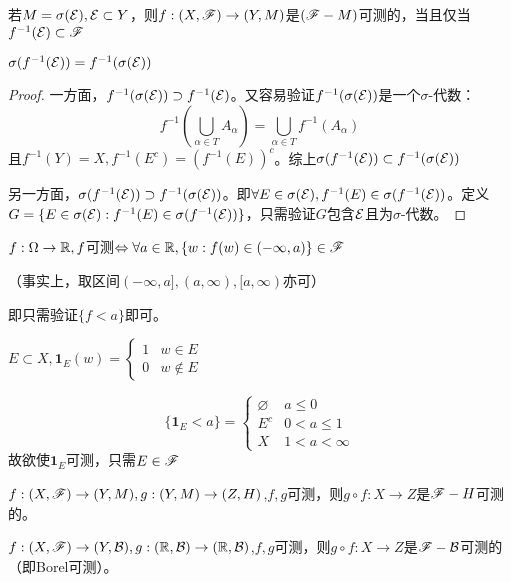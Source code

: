 \documentclass{ctexbook}
\begin{document}
\begin{Prop}\label{nosig}
  若$M=\sigma(\mathcal{E}),\mathcal{E}\subset Y$，则$f:(X,\mathscr{F})\to (Y,M)$是$(\mathscr{F}-M)$可测的，当且仅当$f^{-1}(\mathcal{E})\subset \mathscr{F}$
\end{Prop}
\begin{Prop}
  $\sigma(f^{-1}(\mathcal{E}))=f^{-1}(\sigma(\mathcal{E}))$
\end{Prop}
\begin{proof}
  一方面，$f^{-1}(\sigma(\mathcal{E}))\supset f^{-1}(\mathcal{E})$。又容易验证$f^{-1}(\sigma(\mathcal{E}))$是一个$\sigma$-代数：
  \[f^{-1}(\bigcup_{\alpha\in T} A_{\alpha})=\bigcup_{\alpha\in T}f^{-1}(A_{\alpha})\]
  且$f^{-1}(Y)=X, f^{-1}(E^{c})=(f^{-1}(E))^{c}$。综上$\sigma(f^{-1}(\mathcal{E}))\subset f^{-1}(\sigma(\mathcal{E}))$

  另一方面，$\sigma(f^{-1}(\mathcal{E}))\supset f^{-1}(\sigma(\mathcal{E}))$。即$\forall E\in\sigma(\mathcal{E}), f^{-1}(E)\in\sigma(f^{-1}(\mathcal{E}))$。定义$G=\{E\in\sigma(\mathcal{E}):f^{-1}(E)\in \sigma(f^{-1}(\mathcal{E}))\}$，只需验证$G$包含$\mathcal{E}$且为$\sigma$-代数。
\end{proof}

\begin{Cor}
  $f:\Omega\to\mathbb{R}, f$可测$\Leftrightarrow\forall a\in\mathbb{R}, \{w:f(w)\in(-\infty,a)\}\in\mathscr{F}$

  （事实上，取区间$(-\infty,a],(a,\infty),[a,\infty)$亦可）
\end{Cor}

即只需验证$\{f<a\}$即可。

\begin{Eg}[指示函数]
  $E\subset X, \bm{1}_{E}(w)=
  \begin{cases}
    1&w\in E\\0 &w\not\in E
  \end{cases}
  $

  \[\{\bm{1}_{E}<a\}=
    \begin{cases}
      \varnothing&a\leq 0\\E^{c} &0<a\leq 1\\X&1<a<\infty
    \end{cases}
  \]
  故欲使$\bm{1}_{E}$可测，只需$E\in\mathscr{F}$
\end{Eg}

\begin{Eg}
  $f:(X,\mathscr{F})\to (Y,M),g:(Y,M)\to (Z,H)$,$f,g$可测，则$g\circ f:X\to Z$是$\mathscr{F}-H$可测的。
\end{Eg}

\begin{Eg}
  $f:(X,\mathscr{F})\to (Y,\mathcal{B}),g:(\mathbb{R},\mathcal{B})\to (\mathbb{R},\mathcal{B})$,$f,g$可测，则$g\circ f:X\to Z$是$\mathscr{F}-\mathcal{B}$可测的（即Borel可测）。
\end{Eg}
\end{document}
